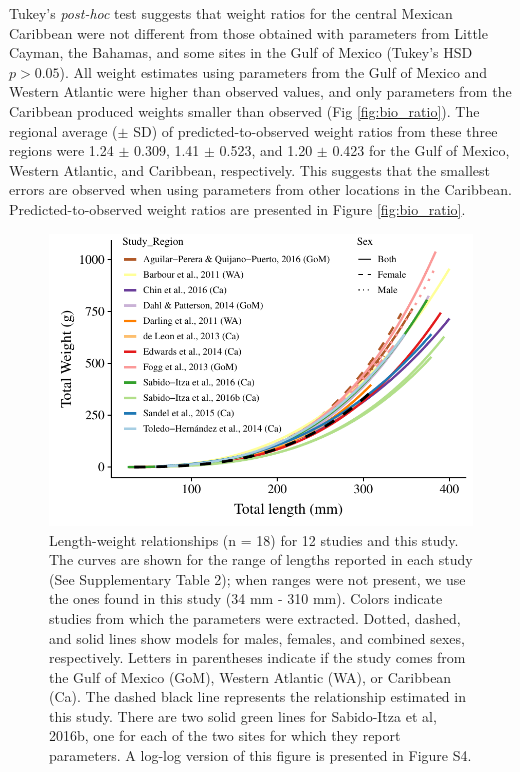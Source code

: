 \documentclass[fleqn,10pt,lineno]{wlpeerj} %
\begin{document}
Tukey's \emph{post-hoc} test suggests that weight ratios for the central
Mexican Caribbean were not different from those obtained with parameters
from Little Cayman, the Bahamas, and some sites in the Gulf of Mexico
(Tukey's HSD \(p > 0.05\)). All weight estimates using parameters from
the Gulf of Mexico and Western Atlantic were higher than observed
values, and only parameters from the Caribbean produced weights smaller
than observed (Fig \ref{fig:bio_ratio}). The regional average (\(\pm\)
SD) of predicted-to-observed weight ratios from these three regions were
1.24 \(\pm\) 0.309, 1.41 \(\pm\) 0.523, and 1.20 \(\pm\) 0.423 for the
Gulf of Mexico, Western Atlantic, and Caribbean, respectively. This
suggests that the smallest errors are observed when using parameters
from other locations in the Caribbean. Predicted-to-observed weight
ratios are presented in Figure \ref{fig:bio_ratio}.

\begin{figure}
\centering
\includegraphics{Manuscript_files/figure-latex/fit2-1.pdf}
\caption{\label{fig:all_allo}Length-weight relationships (n = 18) for 12
studies and this study. The curves are shown for the range of lengths
reported in each study (See Supplementary Table 2); when ranges were not
present, we use the ones found in this study (34 mm - 310 mm). Colors
indicate studies from which the parameters were extracted. Dotted,
dashed, and solid lines show models for males, females, and combined
sexes, respectively. Letters in parentheses indicate if the study comes
from the Gulf of Mexico (GoM), Western Atlantic (WA), or Caribbean (Ca).
The dashed black line represents the relationship estimated in this
study. There are two solid green lines for Sabido-Itza et al, 2016b, one
for each of the two sites for which they report parameters. A log-log
version of this figure is presented in Figure S4.}
\end{figure}
\end{document}
